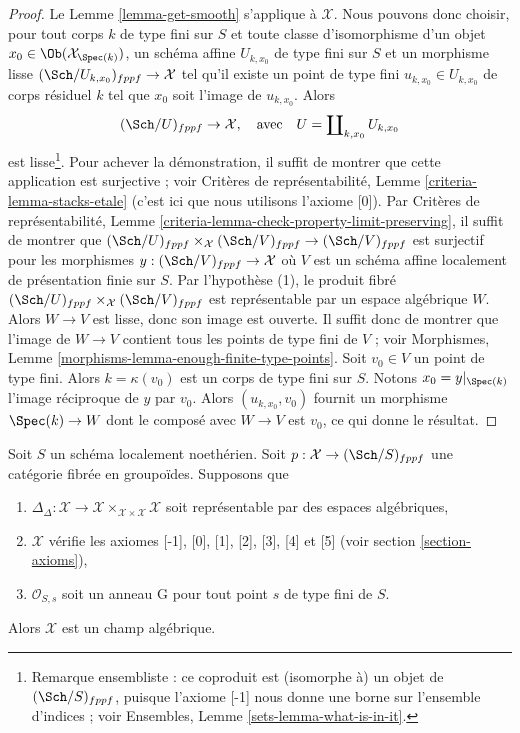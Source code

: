 \begin{proof}
Le Lemme \ref{lemma-get-smooth} s'applique à $\mathcal{X}$. Nous pouvons donc
choisir, pour tout corps $k$ de type fini sur $S$ et toute
classe d'isomorphisme d'un objet $x_0 \in \Ob(\mathcal{X}_{\Spec(k)})$,
un schéma affine $U_{k, x_0}$ de type fini sur $S$ et un morphisme lisse
$(\Sch/U_{k, x_0})_{fppf} \to \mathcal{X}$ tel qu'il existe un point de type
fini $u_{k, x_0} \in U_{k, x_0}$ de corps résiduel $k$ tel que $x_0$
soit l'image de $u_{k, x_0}$. Alors
$$
(\Sch/U)_{fppf} \to \mathcal{X},
\quad\text{avec}\quad
U = \coprod\nolimits_{k, x_0} U_{k, x_0}
$$
est lisse\footnote{Remarque ensembliste : ce coproduit est (isomorphe à)
un objet de $(\Sch/S)_{fppf}$, puisque l'axiome [-1] nous donne une borne
sur l'ensemble d'indices ; voir Ensembles, Lemme \ref{sets-lemma-what-is-in-it}.}.
Pour achever la démonstration, il suffit de montrer que cette application est surjective ;
voir Critères de représentabilité, Lemme \ref{criteria-lemma-stacks-etale}
(c'est ici que nous utilisons l'axiome [0]). Par Critères de représentabilité, Lemme
\ref{criteria-lemma-check-property-limit-preserving},
il suffit de montrer que
$(\Sch/U)_{fppf} \times_\mathcal{X} (\Sch/V)_{fppf} \to (\Sch/V)_{fppf}$
est surjectif pour les morphismes $y : (\Sch/V)_{fppf} \to \mathcal{X}$ où
$V$ est un schéma affine localement de présentation finie
sur $S$. Par l'hypothèse (1), le produit fibré
$(\Sch/U)_{fppf} \times_\mathcal{X} (\Sch/V)_{fppf}$ est représentable
par un espace algébrique $W$. Alors $W \to V$ est lisse, donc son image est
ouverte. Il suffit donc de montrer que l'image de $W \to V$ contient tous les
points de type fini de $V$ ; voir
Morphismes, Lemme \ref{morphisms-lemma-enough-finite-type-points}.
Soit $v_0 \in V$ un point de type fini. Alors $k = \kappa(v_0)$ est
un corps de type fini sur $S$. Notons $x_0 = y|_{\Spec(k)}$
l'image réciproque de $y$ par $v_0$. Alors $(u_{k, x_0}, v_0)$ fournit
un morphisme $\Spec(k) \to W$ dont le composé avec $W \to V$
est $v_0$, ce qui donne le résultat.
\end{proof}

\begin{proposition}
\label{proposition-second-diagonal-representable}
Soit $S$ un schéma localement noethérien. Soit
$p : \mathcal{X} \to (\Sch/S)_{fppf}$ une catégorie fibrée en groupoïdes.
Supposons que
\begin{enumerate}
\item $\Delta_\Delta : \mathcal{X} \to
\mathcal{X} \times_{\mathcal{X} \times \mathcal{X}} \mathcal{X}$
soit représentable par des espaces algébriques,
\item $\mathcal{X}$ vérifie les axiomes [-1], [0], [1], [2], [3], [4] et [5]
(voir section \ref{section-axioms}),
\item $\mathcal{O}_{S, s}$ soit un anneau G pour tout point $s$ de type fini de $S$.
\end{enumerate}
Alors $\mathcal{X}$ est un champ algébrique.
\end{proposition}

